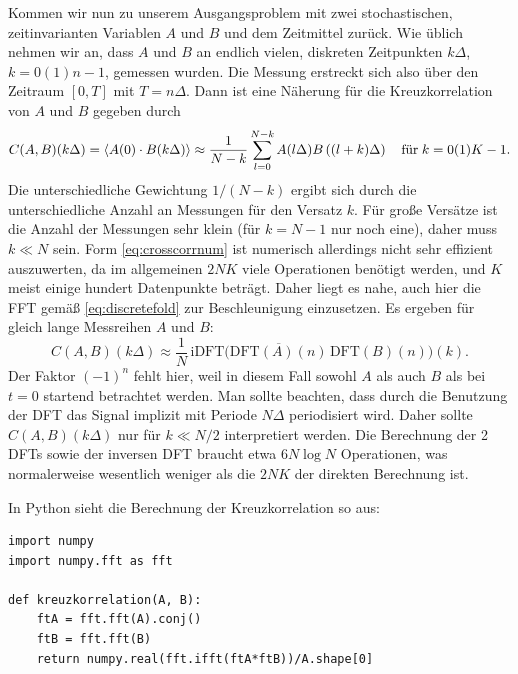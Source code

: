 Kommen wir nun zu unserem Ausgangsproblem mit zwei stochastischen,
zeitinvarianten Variablen $A$ und $B$ und dem Zeitmittel zurück. Wie
üblich nehmen wir an, dass $A$ und $B$ an endlich vielen, diskreten
Zeitpunkten $k\Delta$, $k=0(1)n-1$, gemessen wurden. Die Messung
erstreckt sich also über den Zeitraum $[0,T]$ mit $T=n\Delta$. Dann
ist eine Näherung für die Kreuzkorrelation von $A$ und $B$ gegeben
durch
\begin{equation}
  \label{eq:crosscorrnum}
  C(A,B)(k\Delta) = \left\langle{A(0)\cdot B(k\Delta)}\right\rangle
  \approx
  \frac{1}{N-k}\sum_{l=0}^{N-k}A(l\Delta)B\left((l+k)\Delta\right)
  \quad\text{für}\; k=0(1)K-1.
\end{equation}
Die unterschiedliche Gewichtung $1/(N-k)$ ergibt sich durch die
unterschiedliche Anzahl an Messungen für den Versatz $k$. Für große
Versätze ist die Anzahl der Messungen sehr klein (für $k=N-1$ nur noch
eine), daher muss $k \ll N$ sein. Form \eqref{eq:crosscorrnum} ist
numerisch allerdings nicht sehr effizient auszuwerten, da im
allgemeinen $2NK$ viele Operationen benötigt werden, und $K$ meist
einige hundert Datenpunkte beträgt.  Daher liegt es nahe, auch hier
die FFT gemäß \eqref{eq:discretefold} zur Beschleunigung einzusetzen.
Es ergeben für gleich lange Messreihen $A$ und $B$:
\begin{equation}
  \label{eq:crosscorrnumfft}
  C(A,B)(k\Delta)
  \approx
  \frac{1}{N}\,\text{iDFT}
  \bigl(\overline{\text{DFT}(A)(n)}\,\text{DFT}(B)(n)\bigr)(k).
\end{equation}
Der Faktor $(-1)^n$ fehlt hier, weil in diesem Fall sowohl $A$ als
auch $B$ als bei $t=0$ startend betrachtet werden. Man sollte
beachten, dass durch die Benutzung der DFT das Signal implizit mit
Periode $N\Delta$ periodisiert wird. Daher sollte $C(A,B)(k\Delta)$
nur für $k\ll N/2$ interpretiert werden. Die Berechnung der 2 DFTs
sowie der inversen DFT braucht etwa $6 N\log N$ Operationen, was
normalerweise wesentlich weniger als die $2NK$ der direkten Berechnung
ist.

In Python sieht die Berechnung der Kreuzkorrelation so aus:
\begin{lstlisting}
import numpy
import numpy.fft as fft

def kreuzkorrelation(A, B):
    ftA = fft.fft(A).conj()
    ftB = fft.fft(B)
    return numpy.real(fft.ifft(ftA*ftB))/A.shape[0]
\end{lstlisting}

